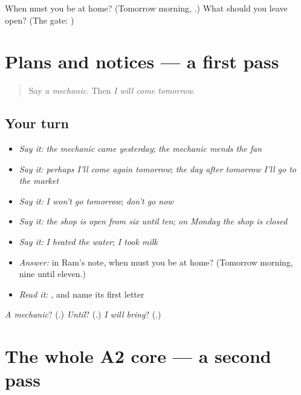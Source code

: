 \begin{tcolorbox}[breakable,colback=teal!4,colframe=teal!35!black,title={Before you move on}]
When must you be at home? (Tomorrow morning, \textbf{   }.) What should you leave open? (The gate: \textbf{  })
\end{tcolorbox}
\section[(dialogue)]{Plans and notices — a first pass}

\label{lesson:MW-R165-first-pass-plans-and-notices}



\begin{quote}
Say \emph{a mechanic}. Then \emph{I will come tomorrow}.
\end{quote}

\subsection*{Your turn}
\begin{itemize}
\raggedright
  \item \emph{Say it:} \emph{the mechanic came yesterday}; \emph{the mechanic mends the fan}
  \item \emph{Say it:} \emph{perhaps I'll come again tomorrow}; \emph{the day after tomorrow I'll go to the market}
  \item \emph{Say it:} \emph{I won't go tomorrow}; \emph{don't go now}
  \item \emph{Say it:} \emph{the shop is open from six until ten}; \emph{on Monday the shop is closed}
  \item \emph{Say it:} \emph{I heated the water}; \emph{I took milk}
  \item \emph{Answer:} in Ram's note, when must you be at home? (Tomorrow morning, nine until eleven.)
  \item \emph{Read it:} \textbf{}, and name its first letter
\end{itemize}

\begin{tcolorbox}[breakable,colback=teal!4,colframe=teal!35!black,title={Before you move on}]
\emph{A mechanic}? (\textbf{}.) \emph{Until}? (\textbf{}.) \emph{I will bring}? (\textbf{}.)
\end{tcolorbox}
\section[(dialogue)]{The whole A2 core — a second pass}

